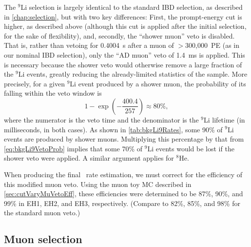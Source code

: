\documentclass[../thesis.tex]{subfiles}
\begin{document}
The $^9$Li selection is largely identical to the standard IBD selection, as described in \autoref{chap:selection}, but with two key differences: First, the prompt-energy cut is higher, as described above (although this cut is applied after the initial selection, for the sake of flexibility), and, secondly, the ``shower muon'' veto is disabled. That is, rather than vetoing for 0.4004~s after a muon of $>$300,000~PE (as in our nominal IBD selection), only the ``AD muon'' veto of 1.4~ms is applied. This is necessary because the shower veto would otherwise remove a large fraction of the $^9$Li events, greatly reducing the already-limited statistics of the sample. More precisely, for a given $^9$Li event produced by a shower muon, the probability of its falling within the veto window is
\begin{equation}
  \label{eq:bkgLi9VetoProb}
  1 - \exp\left( - \frac{400.4}{257} \right) \approx 80\%,
\end{equation}
where the numerator is the veto time and the denominator is the $^9$Li lifetime (in milliseconds, in both cases). As shown in \autoref{tab:bkgLi9Rates}, some 90\% of $^9$Li events are produced by shower muons. Multiplying this percentage by that from \autoref{eq:bkgLi9VetoProb} implies that some 70\% of $^9$Li events would be lost if the shower veto were applied. A similar argument applies for $^8$He.

When producing the final \linine\ rate estimation, we must correct for the efficiency of this modified muon veto. Using the muon toy MC described in \autoref{sec:cutVaryMuVetoEff}, these efficiencies were determined to be 87\%, 90\%, and 99\% in EH1, EH2, and EH3, respectively. (Compare to 82\%, 85\%, and 98\% for the standard muon veto.)


\subsection{Muon selection}
\label{sec:bkgLi9MuonSel}
\end{document}
